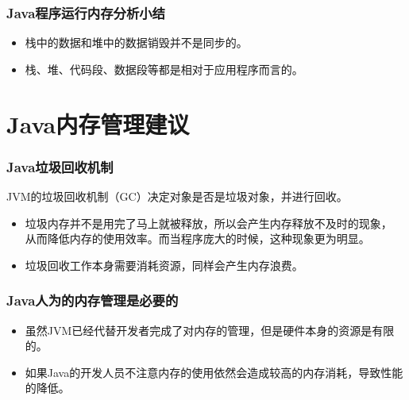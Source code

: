 \begin{frame}[fragile] %
  \frametitle{Java程序运行内存分析小结}

  \begin{itemize}[<+-| structure@+>]\kai
  \item {\hei\Red 栈中的数据和堆中的数据销毁并不是同步的。}
    
  \item {\hei\Red 栈、堆、代码段、数据段等都是相对于应用程序而言的。}
  \end{itemize}
\end{frame}

\section{Java内存管理建议}

\begin{frame}[fragile] %
\frametitle{Java垃圾回收机制} 

{\hei\Blue JVM的垃圾回收机制（GC）决定对象是否是垃圾对象，并进行回收。}


\begin{itemize}
\item 垃圾内存并不是用完了马上就被释放，所以会产生内存释放不及时的现象，
  从而降低内存的使用效率。而当程序庞大的时候，这种现象更为明显。
\item 垃圾回收工作本身需要消耗资源，同样会产生内存浪费。
\end{itemize}

\end{frame}

\begin{frame}[fragile] %
\frametitle{Java人为的内存管理是必要的} 


\begin{itemize}
\item 虽然JVM已经代替开发者完成了对内存的管理，但是硬件本身的资源是有限的。
\item 如果Java的开发人员不注意内存的使用依然会造成较高的内存消耗，导致性能的降低。
\end{itemize}

\end{frame}


